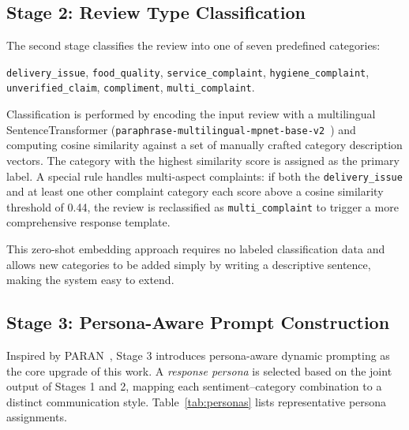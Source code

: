 \documentclass[conference]{IEEEtran}
\begin{document}
\subsection{Stage 2: Review Type Classification}

The second stage classifies the review into one of seven predefined
categories:
\begin{sloppypar}
\noindent\texttt{delivery\_issue}, \texttt{food\_quality},
\texttt{service\_complaint}, \texttt{hygiene\_complaint},
\texttt{unverified\_claim}, \texttt{compliment},
\texttt{multi\_complaint}.
\end{sloppypar}

Classification is performed by encoding the input review with a
multilingual SentenceTransformer
(\texttt{paraphrase-multilingual-\allowbreak{}mpnet-base-v2}~\cite{sbert2019}) and
computing cosine similarity against a set of manually crafted category
description vectors.
The category with the highest similarity score is assigned as the
primary label.
A special rule handles multi-aspect complaints: if both the
\texttt{delivery\_issue} and at least one other complaint category each
score above a cosine similarity threshold of 0.44, the review is
reclassified as \texttt{multi\_complaint} to trigger a more
comprehensive response template.

This zero-shot embedding approach requires no labeled classification
data and allows new categories to be added simply by writing a
descriptive sentence, making the system easy to extend.

\subsection{Stage 3: Persona-Aware Prompt Construction}

Inspired by PARAN~\cite{paran2024}, Stage 3 introduces persona-aware
dynamic prompting as the core upgrade of this work.
A \textit{response persona} is selected based on the joint output of
Stages 1 and 2, mapping each sentiment--category combination to a
distinct communication style.
Table~\ref{tab:personas} lists representative persona assignments.
\end{document}
